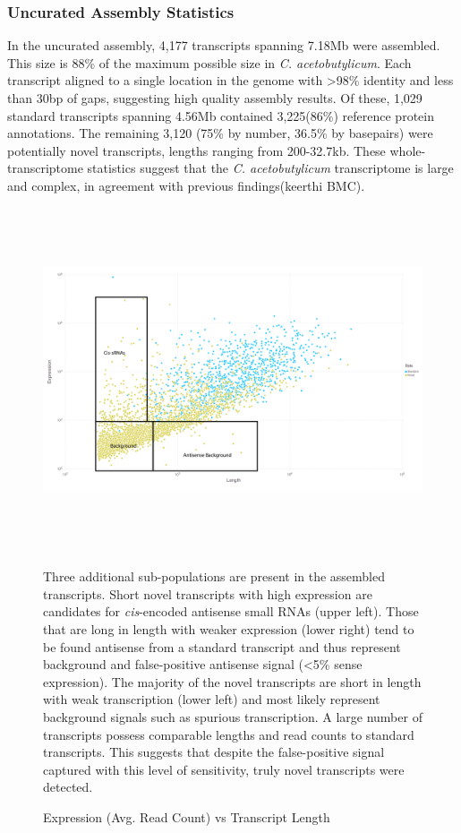 \subsubsection{Uncurated Assembly Statistics}

In the uncurated assembly, 4,177 transcripts spanning 7.18Mb were assembled. This size is 88\% of the maximum possible size in \textit{C. acetobutylicum}. Each transcript aligned to a single location in the genome with \textgreater 98\% identity and less than 30bp of gaps, suggesting high quality assembly results. Of these, 1,029 standard transcripts spanning 4.56Mb contained 3,225(86\%) reference protein annotations. The remaining 3,120 (75\% by number, 36.5\% by basepairs) were potentially novel transcripts, lengths ranging from 200-32.7kb. These whole-transcriptome statistics suggest that the \textit{C. acetobutylicum} transcriptome is large and complex, in agreement with previous findings(keerthi BMC).

\begin{figure}[h!]
\small
\begin{center}
\includegraphics[width=\textwidth,height=4in]{images/Assembly/Summary/Depth_vs_length.png}
\end{center}
\caption{Expression (Avg. Read Count) vs Transcript Length}\label{fig:5.3}
Three additional sub-populations are present in the assembled transcripts. Short novel transcripts with high expression are candidates for \textit{cis}-encoded antisense small RNAs (upper left). Those that are long in length with weaker expression (lower right) tend to be found antisense from a standard transcript and thus represent background and false-positive antisense signal (\textless 5\% sense expression). The majority of the novel transcripts are short in length with weak transcription (lower left) and most likely represent background signals such as spurious transcription. A large number of transcripts possess comparable lengths and read counts to standard transcripts. This suggests that despite the false-positive signal captured with this level of sensitivity, truly novel transcripts were detected.
\end{figure}

